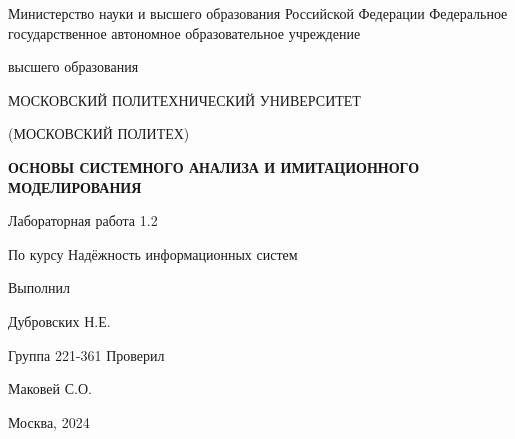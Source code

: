 \singlespacing

\newpage
\begin{center}
    Министерство науки и высшего образования Российской Федерации
    Федеральное государственное автономное образовательное учреждение

    высшего образования

    \guillemotleft МОСКОВСКИЙ ПОЛИТЕХНИЧЕСКИЙ УНИВЕРСИТЕТ\guillemotright

    (МОСКОВСКИЙ ПОЛИТЕХ)
\end{center}
\noindent
\bigbreak
\bigbreak
\bigbreak
\bigbreak
\begin{center}
    \textbf{ОСНОВЫ СИСТЕМНОГО АНАЛИЗА И ИМИТАЦИОННОГО МОДЕЛИРОВАНИЯ}
    \bigskip
    \bigskip
    \bigskip
    \bigskip
    \bigskip

    Лабораторная работа 1.2

    По курсу \guillemotleft Надёжность информационных систем\guillemotright
    \bigskip

    \bigbreak
    \bigbreak
    \bigbreak
    \bigbreak
\end{center}
\noindent
\bigbreak
\bigbreak
\bigbreak
\bigbreak
\bigbreak
\bigbreak
\bigbreak
\bigbreak
\bigbreak
\bigbreak
\hfill Выполнил

\hfill Дубровских Н.Е.

\hfill Группа 221-361
\bigbreak
\bigbreak
\bigbreak
\hfill Проверил

\hfill Маковей С.О.
\vfill
\begin{center}
    Москва, 2024
\end{center}
\newpage
\onehalfspacing
